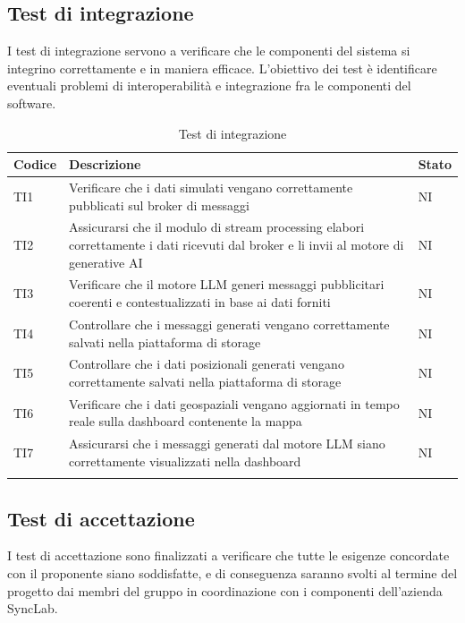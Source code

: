 \documentclass[10pt]{article}
\begin{document}
\begin{justify}
\subsection{Test di integrazione}
I test di integrazione servono a verificare che le componenti del sistema si integrino correttamente e in maniera efficace. L'obiettivo dei test
è identificare eventuali problemi di interoperabilità e integrazione fra le componenti del software.\\

\begin{longtable}{|>{\centering\arraybackslash}m{2cm}|>{\centering\arraybackslash}m{7cm}|>{\centering\arraybackslash}m{2cm}|}
\hline
\textbf{Codice} & \textbf{Descrizione} & \textbf{Stato}\\
\endhead
\hline
TI1 & Verificare che i dati simulati vengano correttamente pubblicati sul broker di messaggi & NI\\
\hline
TI2 & Assicurarsi che il modulo di stream processing elabori correttamente i dati ricevuti dal broker e li invii al motore di generative AI & NI\\
\hline
TI3 & Verificare che il motore LLM generi messaggi pubblicitari coerenti e contestualizzati in base ai dati forniti & NI\\
\hline
TI4 & Controllare che i messaggi generati vengano correttamente salvati nella piattaforma di storage & NI\\
\hline
TI5 & Controllare che i dati posizionali generati vengano correttamente salvati nella piattaforma di storage & NI\\
\hline
TI6 & Verificare che i dati geospaziali vengano aggiornati in tempo reale sulla dashboard contenente la mappa & NI\\
\hline
TI7 & Assicurarsi che i messaggi generati dal motore LLM siano correttamente visualizzati nella dashboard & NI\\
\hline
\caption{Test di integrazione}\\
\end{longtable}

\subsection{Test di accettazione}
I test di accettazione sono finalizzati a verificare che tutte le esigenze concordate con il proponente siano soddisfatte, e di conseguenza saranno
svolti al termine del progetto dai membri del gruppo in coordinazione con i componenti dell'azienda SyncLab.\\


\end{justify}
\end{document}
